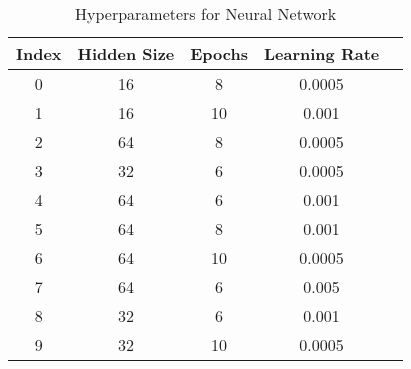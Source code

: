\begin{table*}
    \centering
    \begin{tabular}{@{}ccccc@{}}
        \toprule
        \textbf{Index} & \textbf{Hidden Size} & \textbf{Epochs} & \textbf{Learning Rate} \\ \midrule
        0 & 16 & 8 & 0.0005 \\
        1 & 16 & 10 & 0.001 \\
        2 & 64 & 8 & 0.0005 \\
        3 & 32 & 6 & 0.0005 \\
        4 & 64 & 6 & 0.001 \\
        5 & 64 & 8 & 0.001 \\
        6 & 64 & 10 & 0.0005 \\
        7 & 64 & 6 & 0.005 \\
        8 & 32 & 6 & 0.001 \\
        9 & 32 & 10 & 0.0005 \\ \bottomrule
    \end{tabular}
    \caption{Hyperparameters for Neural Network}
    \label{tab:nn_search_spaces}
\end{table*}
